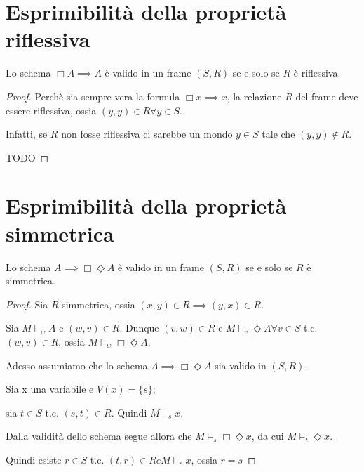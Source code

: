 \documentclass[10pt,a4paper,twoside]{book}
\begin{document}
\section{Esprimibilità della proprietà riflessiva}
\begin{theorem}
    Lo schema $\Box A \implies A$ è valido in un frame $(S,R)$ se e solo se $R$ è riflessiva.
\end{theorem}
\begin{proof}
    Perchè sia sempre vera la formula $\Box x \implies x$, la relazione $R$ del frame deve essere riflessiva, ossia $(y,y) \in R \forall y \in S$.

    Infatti, se $R$ non fosse riflessiva ci sarebbe un mondo $y \in S$ tale che $(y,y) \notin R$.

    TODO
\end{proof}
\newpage

\section{Esprimibilità della proprietà simmetrica}
\begin{theorem}
    Lo schema $ A \implies \Box \Diamond A$ è valido in un frame $(S,R)$ se e solo se $R$ è simmetrica.
\end{theorem}
\begin{proof}
    Sia $R$ simmetrica, ossia $(x,y) \in R \implies (y,x) \in R$.

    Sia $M \vDash_w A$ e $(w,v) \in R$. Dunque $(v,w) \in R$ e $M \vDash_v \Diamond A \forall v \in S$ t.c. $(w,v) \in R$, ossia $M \vDash_w \Box \Diamond A$.

    Adesso assumiamo che lo schema $A \implies \Box \Diamond A $ sia valido in $(S,R)$.

    Sia x una variabile e $V(x) = \{s\}$;

    sia $t \in S$ t.c. $(s,t) \in R$. Quindi $M \vDash_s x$.

    Dalla validità dello schema segue allora che $M \vDash_s \Box \Diamond x$, da cui $M \vDash_t \Diamond x$.

    Quindi esiste $r \in S$ t.c. $(t,r) \in R e M \vDash_r x$, ossia $r = s$
\end{proof}
\newpage
\end{document}
